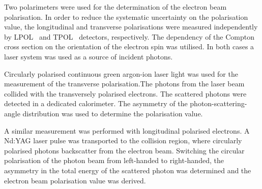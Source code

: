 Two polarimeters were used for the determination of the electron beam polarisation. In order to reduce the systematic uncertainty on the polarisation value, the longitudinal and transverse polarisations were measured independently by LPOL~\cite{nim:a479:334} and TPOL~\cite{nim:a329:79} detectors, respectively. The dependency of the Compton cross section on the orientation of the electron spin was utilised. In both cases a laser system was used as a source of incident photons.

Circularly polarised continuous green argon-ion laser light was used for the measurement of the transverse polarisation.The photons from the laser beam collided with the transversely polarised electrons. The scattered photons were detected in a dedicated calorimeter. The asymmetry of the photon-scattering-angle distribution was used to determine the polarisation value.

A similar measurement was performed with longitudinal polarised electrons. A Nd:YAG laser pulse was transported to the collision region, where circularly polarised photons backscatter from the electron beam. Switching the circular polarisation of the photon beam from left-handed to right-handed, the asymmetry in the total energy of the scattered photon was determined and the electron beam polarisation value was derived.
